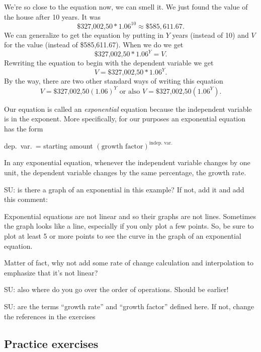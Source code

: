 We're so close to the equation now, we can smell it.  We just found the value of the house after 10 years.  It was $$\$\text{327,002,50} \ast 1.06^{10} \approx \$585,611.67.$$  We can generalize to get the equation by putting in $Y$ years (instead of 10) and $V$ for the value (instead of \$585,611.67).  When we do we get$$\$\text{327,002,50} \ast 1.06^{Y} = V.$$ Rewriting the equation to begin with the dependent variable we get $$ V = \$\text{327,002,50} \ast 1.06^{Y}.$$  By the way, there are two other standard ways of writing this equation  $$ V = \$\text{327,002,50} (1.06)^{Y} \text{ or also } V = \$\text{327,002,50}\left(1.06^{Y}\right).$$


Our equation is called an \emph{exponential} equation because the independent variable is in the exponent.  More specifically, for our purposes an exponential equation has the form

\begin{center}
dep.\ var.\ = starting amount $\left(\text{growth factor}\right)^{\text{indep.\ var.\ }}$
\end{center}

In any exponential equation, whenever the independent variable changes by one unit, the dependent variable changes by the same percentage, the growth rate.

SU:  is there a graph of an exponential in this example?  If not, add it and add this comment:

Exponential equations are not linear and so their graphs are not lines.  Sometimes the graph looks like a  line, especially if you only plot a few points.  So, be sure to plot at least 5 or more points to see the curve in the graph of an exponential equation.

Matter of fact, why not add some rate of change calculation and interpolation to emphasize that it's not linear?

SU:  also where do you go over the order of operations.  Should be earlier!

SU:  are the terms ``growth rate'' and ``growth factor'' defined here.  If not, change the references in the exercises

\newpage
\subsection*{Practice exercises}

